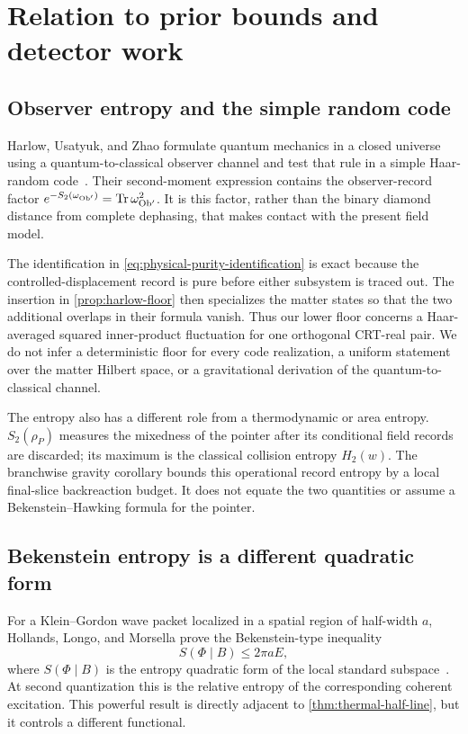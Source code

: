 \section{Relation to prior bounds and detector work}
\label{sec:comparison}

\subsection{Observer entropy and the simple random code}

Harlow, Usatyuk, and Zhao formulate quantum mechanics in a closed universe
using a quantum-to-classical observer channel and test that rule in a simple
Haar-random code~\cite{HarlowUsatyukZhao2025}.  Their second-moment expression
contains the observer-record factor
$e^{-S_2(\omega_{\rm Ob'})}=\operatorname{Tr}\omega_{\rm Ob'}^2$.  It is this factor, rather
than the binary diamond distance from complete dephasing, that makes contact
with the present field model.

The identification in \cref{eq:physical-purity-identification} is exact
because the controlled-displacement record is pure before either subsystem is
traced out.  The insertion in \cref{prop:harlow-floor} then specializes the
matter states so that the two additional overlaps in their formula vanish.
Thus our lower floor concerns a Haar-averaged squared inner-product
fluctuation for one orthogonal CRT-real pair.  We do not infer a deterministic
floor for every code realization, a uniform statement over the matter Hilbert
space, or a gravitational derivation of the quantum-to-classical channel.

The entropy also has a different role from a thermodynamic or area entropy.
$S_2(\rho_P)$ measures the mixedness of the pointer after its conditional
field records are discarded; its maximum is the classical collision entropy
$H_2(w)$.  The branchwise gravity corollary bounds this operational record
entropy by a local final-slice backreaction budget.  It does not equate the two
quantities or assume a Bekenstein--Hawking formula for the pointer.

\subsection{Bekenstein entropy is a different quadratic form}

For a Klein--Gordon wave packet localized in a spatial region of half-width
$a$, Hollands, Longo, and Morsella prove the Bekenstein-type inequality
\begin{equation}
 S(\Phi\mid B)\leq2\pi a E,
 \label{eq:bekenstein-bound}
\end{equation}
where $S(\Phi\mid B)$ is the entropy quadratic form of the local standard
subspace~\cite{HollandsLongoMorsella2026}.  At second quantization this is the
relative entropy of the corresponding coherent excitation.  This powerful
result is directly adjacent to \cref{thm:thermal-half-line}, but it controls a
different functional.

